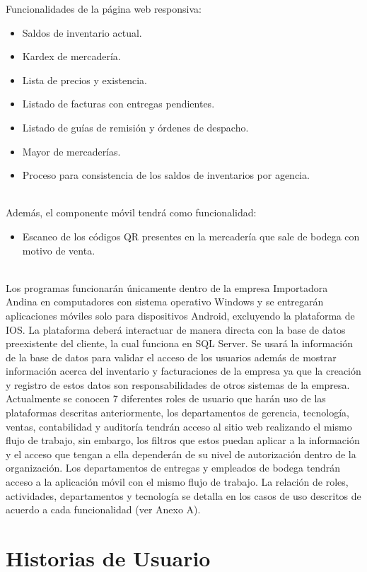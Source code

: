 \documentclass{scrreprt}
\begin{document}
Funcionalidades de la página web responsiva:
\begin{itemize}
    \item Saldos de inventario actual.
    \item Kardex de mercadería.
    \item Lista de precios y existencia.
    \item Listado de facturas con entregas pendientes.
    \item Listado de guías de remisión y órdenes de despacho.
    \item Mayor de mercaderías.
    \item Proceso para consistencia de los saldos de inventarios por agencia.
\end{itemize}
\\

Además, el  componente móvil tendrá como funcionalidad:
\begin{itemize}
    \item Escaneo de los códigos QR presentes en la mercadería que sale de bodega con motivo de venta.
\end{itemize}
\\

Los programas funcionarán únicamente dentro de la empresa Importadora Andina en computadores con sistema operativo Windows y se entregarán aplicaciones móviles solo para dispositivos Android, excluyendo la plataforma de IOS. La plataforma deberá interactuar de manera directa con la base de datos preexistente del cliente, la cual funciona en SQL Server. Se usará la información de la base de datos para validar el acceso de los usuarios además de mostrar información acerca del inventario y facturaciones de la empresa ya que la creación y registro de estos datos son responsabilidades de otros sistemas de la empresa. 
Actualmente se conocen 7 diferentes roles de usuario que harán uso de las plataformas descritas anteriormente, los departamentos de gerencia, tecnología, ventas, contabilidad y auditoría tendrán acceso al sitio web realizando el mismo flujo de trabajo, sin embargo, los filtros que estos puedan aplicar a la información y el acceso que tengan a ella dependerán de su nivel de autorización dentro de la organización.
Los departamentos de entregas y empleados de bodega tendrán acceso a la aplicación móvil con el mismo flujo de trabajo. La relación de roles, actividades, departamentos y tecnología se detalla en los casos de uso descritos de acuerdo a cada funcionalidad (ver Anexo A).

\section{Historias de Usuario}
\end{document}
